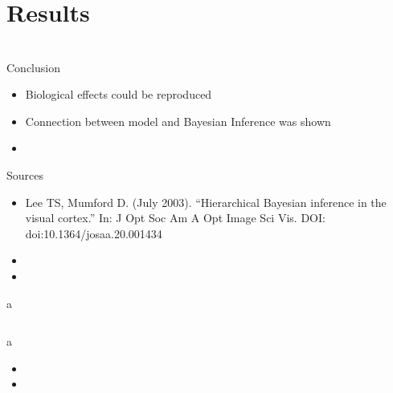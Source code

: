 \documentclass[aspectratio=169]{beamer}
\begin{document}
\section{Results}



\section*{}

\begin{frame}{Conclusion}
    \begin{itemize}
    \item Biological effects could be reproduced
    \item Connection between model and Bayesian Inference was shown
    \item 
  \end{itemize}

\end{frame}

\begin{frame}{Sources}
    \begin{itemize}
    \item  Lee TS, Mumford D. (July 2003). “Hierarchical Bayesian inference in the
 visual cortex.” In: J Opt Soc Am A Opt Image Sci Vis. DOI: doi:10.1364/josaa.20.001434
    \item 
    \item 
  \end{itemize}

\end{frame}

\begin{frame}{a}
   \begin{columns}[onlytextwidth]
	\begin{column}{0.5\textwidth}
	\end{column}
	\begin{column}{0.5\textwidth}
	\end{column}
	\end{columns}
\end{frame}

\begin{frame}{a}
	\begin{itemize}
	  \item
	  \item
	\end{itemize}
\end{frame}
\end{document}

